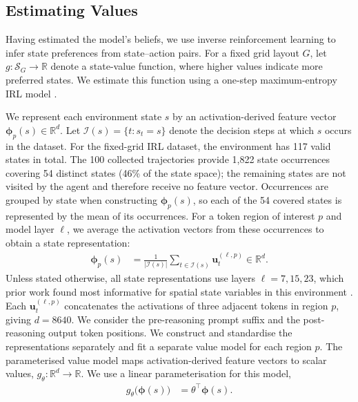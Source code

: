 \documentclass{article}
\begin{document}
\subsection{Estimating Values}
\label{sec:estimating-values}

Having estimated the model's beliefs, we use inverse reinforcement learning to infer state preferences from state--action pairs.
For a fixed grid layout $G$, let $g:\mathcal S_G\rightarrow\mathbb R$ denote a state-value function, where higher values indicate more preferred states.
We estimate this function using a one-step maximum-entropy IRL model \cite{ng2000algorithms,ziebart2008maximum}.


We represent each environment state $s$ by an activation-derived feature vector $\boldsymbol{\phi}_p(s)\in\mathbb R^d$.
Let $\mathcal I(s)=\{t:s_t=s\}$ denote the decision steps at which $s$ occurs in the dataset. For the fixed-grid IRL dataset, the environment has 117 valid states in total.
The 100 collected trajectories provide 1{,}822 state occurrences covering
54 distinct states (46\% of the state space); the remaining states are not
visited by the agent and therefore receive no feature vector. Occurrences are grouped by state when constructing $\boldsymbol{\phi}_p(s)$, so each of the 54 covered states is represented by the mean of its occurrences. 
For a token region of interest $p$ and model layer $\ell$, we average the activation vectors from these occurrences to obtain a state representation:
\begin{align}
    \boldsymbol{\phi}_p(s)
    &=
    \frac{1}{|\mathcal I(s)|}
    \sum_{t\in\mathcal I(s)}
    \mathbf{u}_t^{(\ell,p)}
    \in\mathbb R^d.
    \label{eq:activation-state-representation}
\end{align}
Unless stated otherwise, all state representations use layers $\ell=7,15,23$, which
prior work found most informative for spatial state variables in this
environment \citep{arghal2026behavioural}. Each $\mathbf{u}_t^{(\ell,p)}$
concatenates the activations of three adjacent tokens in region $p$, giving
$d = 8640$. We consider the pre-reasoning prompt suffix and the post-reasoning output token positions.
We construct and standardise the representations separately and fit a separate value model for each region $p$.
The parameterised value model maps activation-derived feature vectors to scalar values, $g_\theta:\mathbb R^d\rightarrow\mathbb R$.
We use a linear parameterisation for this model,
\begin{align}
    g_\theta\bigl(\boldsymbol{\phi}(s)\bigr)
    &=
    \theta^\top\boldsymbol{\phi}(s).
    \label{eq:linear-state-value}
\end{align}
\end{document}
